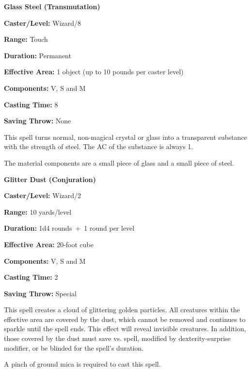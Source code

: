 \begin{multicols}{2}
\begin{minipage}{\columnwidth}
\noindent \textbf{Glass Steel (Transmutation)}

\noindent \textbf{Caster/Level:} Wizard/8

\noindent \textbf{Range:} Touch

\noindent \textbf{Duration:} Permanent

\noindent \textbf{Effective Area:} 1 object (up to 10 pounds per caster level)

\noindent \textbf{Components:} V, S and M

\noindent \textbf{Casting Time:} 8

\noindent \textbf{Saving Throw:} None

\end{minipage}

This spell turns normal, non-magical crystal or glass into a transparent substance with the strength of steel.  The AC of the substance is always 1.  

The material components are a small piece of glass and a small piece of steel.

\vspace{1em}

\noindent
\begin{minipage}{\columnwidth}

\noindent \textbf{Glitter Dust (Conjuration)}

\noindent \textbf{Caster/Level:} Wizard/2

\noindent \textbf{Range:} 10 yards/level

\noindent \textbf{Duration:} 1d4 rounds~+~1 round per level

\noindent \textbf{Effective Area:} 20-foot cube

\noindent \textbf{Components:} V, S and M

\noindent \textbf{Casting Time:} 2

\noindent \textbf{Saving Throw:} Special

\end{minipage}

This spell creates a cloud of glittering golden particles.  All creatures within the effective area are covered by the dust, which cannot be removed and continues to sparkle until the spell ends.  This effect will reveal invisible creatures.  In addition, those covered by the dust must save vs. spell, modified by dexterity-surprise modifier, or be blinded for the spell's duration. 

A pinch of ground mica is required to cast this spell.


\end{multicols}
